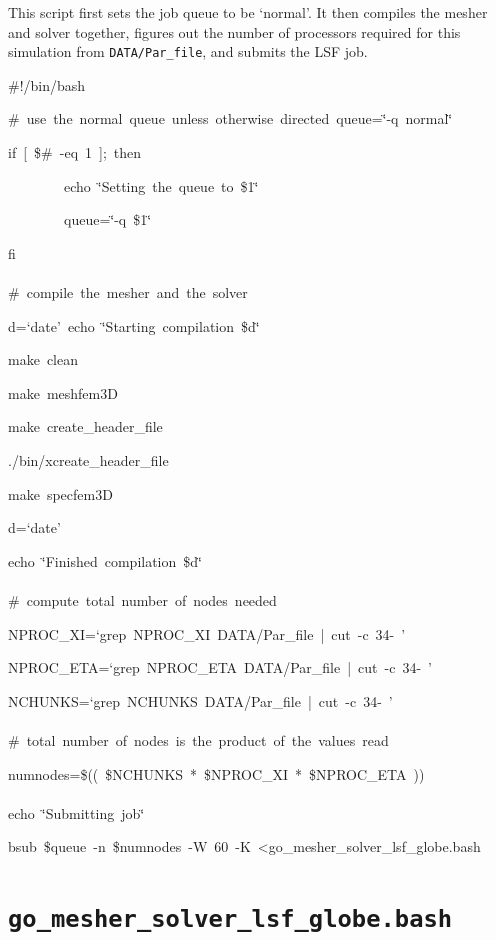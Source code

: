 \documentclass[oneside,english]{book}
\newenvironment{lyxcode}
{\begin{list}{}{
\setlength{\rightmargin}{\leftmargin}
\setlength{\listparindent}{0pt}%
\raggedright
\setlength{\itemsep}{0pt}
\setlength{\parsep}{0pt}
\normalfont\ttfamily}%
 \item[]}
{\end{list}}
\begin{document}
This script first sets the job queue to be `normal'. It then compiles
the mesher and solver together, figures out the number of processors
required for this simulation from \texttt{DATA/Par\_file}, and submits
the LSF job.

\begin{lyxcode}
\#!/bin/bash

\#~use~the~normal~queue~unless~otherwise~directed~queue=\char`\"{}-q~normal\char`\"{}~

if~{[}~\$\#~-eq~1~];~then

~~~~~~~~echo~\char`\"{}Setting~the~queue~to~\$1\char`\"{}

~~~~~~~~queue=\char`\"{}-q~\$1\char`\"{}~

fi~\\
~\\
\#~compile~the~mesher~and~the~solver~

d=`date'~echo~\char`\"{}Starting~compilation~\$d\char`\"{}~

make~clean~

make~meshfem3D~

make~create\_header\_file~

./bin/xcreate\_header\_file~

make~specfem3D~

d=`date'~

echo~\char`\"{}Finished~compilation~\$d\char`\"{}~\\
~\\
\#~compute~total~number~of~nodes~needed~

NPROC\_XI=`grep~NPROC\_XI~DATA/Par\_file~|~cut~-c~34-~'~

NPROC\_ETA=`grep~NPROC\_ETA~DATA/Par\_file~|~cut~-c~34-~'~

NCHUNKS=`grep~NCHUNKS~DATA/Par\_file~|~cut~-c~34-~'~\\
~\\
\#~total~number~of~nodes~is~the~product~of~the~values~read~

numnodes=\$((~\$NCHUNKS~{*}~\$NPROC\_XI~{*}~\$NPROC\_ETA~))~\\
~\\
echo~\char`\"{}Submitting~job\char`\"{}~

bsub~\$queue~-n~\$numnodes~-W~60~-K~<go\_mesher\_solver\_lsf\_globe.bash~
\end{lyxcode}

\section{\texttt{go\_mesher\_solver\_lsf\_globe.bash}}
\end{document}
